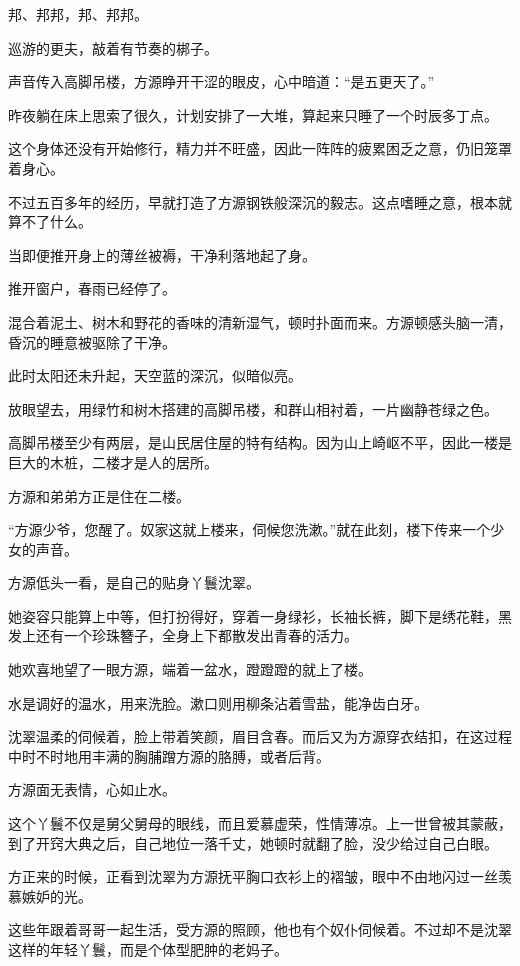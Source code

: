 
\begin{this_body}

邦、邦邦，邦、邦邦。

巡游的更夫，敲着有节奏的梆子。

声音传入高脚吊楼，方源睁开干涩的眼皮，心中暗道：“是五更天了。”

昨夜躺在床上思索了很久，计划安排了一大堆，算起来只睡了一个时辰多丁点。

这个身体还没有开始修行，精力并不旺盛，因此一阵阵的疲累困乏之意，仍旧笼罩着身心。

不过五百多年的经历，早就打造了方源钢铁般深沉的毅志。这点嗜睡之意，根本就算不了什么。

当即便推开身上的薄丝被褥，干净利落地起了身。

推开窗户，春雨已经停了。

混合着泥土、树木和野花的香味的清新湿气，顿时扑面而来。方源顿感头脑一清，昏沉的睡意被驱除了干净。

此时太阳还未升起，天空蓝的深沉，似暗似亮。

放眼望去，用绿竹和树木搭建的高脚吊楼，和群山相衬着，一片幽静苍绿之色。

高脚吊楼至少有两层，是山民居住屋的特有结构。因为山上崎岖不平，因此一楼是巨大的木桩，二楼才是人的居所。

方源和弟弟方正是住在二楼。

“方源少爷，您醒了。奴家这就上楼来，伺候您洗漱。”就在此刻，楼下传来一个少女的声音。

方源低头一看，是自己的贴身丫鬟沈翠。

她姿容只能算上中等，但打扮得好，穿着一身绿衫，长袖长裤，脚下是绣花鞋，黑发上还有一个珍珠簪子，全身上下都散发出青春的活力。

她欢喜地望了一眼方源，端着一盆水，蹬蹬蹬的就上了楼。

水是调好的温水，用来洗脸。漱口则用柳条沾着雪盐，能净齿白牙。

沈翠温柔的伺候着，脸上带着笑颜，眉目含春。而后又为方源穿衣结扣，在这过程中时不时地用丰满的胸脯蹭方源的胳膊，或者后背。

方源面无表情，心如止水。

这个丫鬟不仅是舅父舅母的眼线，而且爱慕虚荣，性情薄凉。上一世曾被其蒙蔽，到了开窍大典之后，自己地位一落千丈，她顿时就翻了脸，没少给过自己白眼。

方正来的时候，正看到沈翠为方源抚平胸口衣衫上的褶皱，眼中不由地闪过一丝羡慕嫉妒的光。

这些年跟着哥哥一起生活，受方源的照顾，他也有个奴仆伺候着。不过却不是沈翠这样的年轻丫鬟，而是个体型肥肿的老妈子。


\end{this_body}
